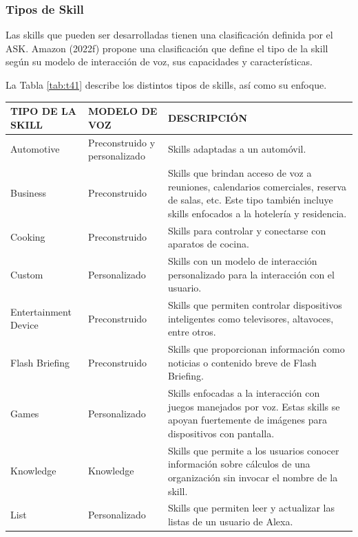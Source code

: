 \subsubsection{Tipos de Skill}
\label{TiposSkillcapIV}

Las skills que pueden ser desarrolladas tienen una clasificación definida por el ASK. Amazon (2022f) propone una clasificación que define el tipo de la skill según su modelo de interacción de voz, sus capacidades y características.

La Tabla \ref{tab:t41} describe los distintos tipos de skills, así como su enfoque.

\begin{table}[H]
  \begin{center}
    \begin{tabular}{ | p{4cm} | p{4cm} | p{8cm} | }
      \hline
      TIPO DE LA SKILL & MODELO DE VOZ & DESCRIPCIÓN  \\ \hline
      Automotive & Preconstruido y personalizado & Skills adaptadas a un automóvil. \\ \hline
      Business & Preconstruido & Skills que brindan acceso de voz a reuniones, calendarios comerciales, reserva de salas, etc. Este tipo también incluye skills enfocados a la hotelería y residencia. \\ \hline
      Cooking & Preconstruido & Skills para controlar y conectarse con aparatos de cocina. \\ \hline
      Custom & Personalizado & Skills con un modelo de interacción personalizado para la interacción con el usuario. \\ \hline
      Entertainment Device & Preconstruido & Skills que permiten controlar dispositivos inteligentes como televisores, altavoces, entre otros. \\ \hline
      Flash Briefing & Preconstruido & Skills que proporcionan información como noticias o contenido breve de Flash Briefing. \\ \hline
      Games & Personalizado & Skills enfocadas a la interacción con juegos manejados por voz. Estas skills se apoyan fuertemente de imágenes para dispositivos con pantalla. \\ \hline
      Knowledge & Knowledge & Skills que permite a los usuarios conocer información sobre cálculos de una organización sin invocar el nombre de la skill. \\ \hline
      List & Personalizado & Skills que permiten leer y actualizar las listas de un usuario de Alexa. \\ \hline

\end{tabular}
\end{center}
\end{table}
